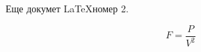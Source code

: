 \documentclass{article}
\begin{document}
Еще докумет \LaTeX номер 2.

$$ F=\frac{P}{V^2} $$
\end{document}
